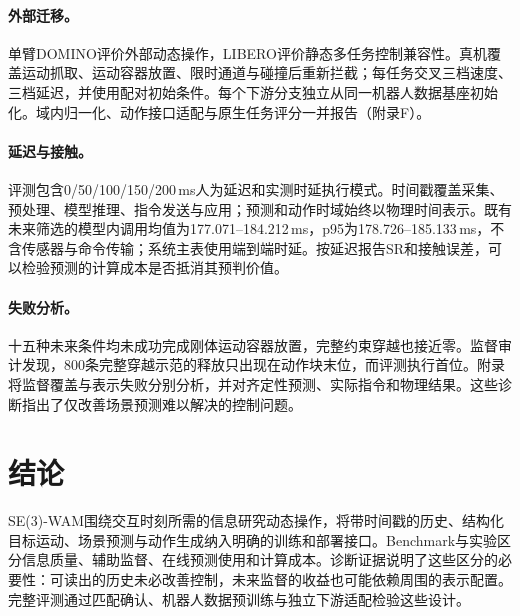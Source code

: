 \paragraph{外部迁移。}
单臂DOMINO评价外部动态操作，LIBERO\cite{libero}评价静态多任务控制兼容性。真机覆盖运动抓取、运动容器放置、限时通道与碰撞后重新拦截；每任务交叉三档速度、三档延迟，并使用配对初始条件。每个下游分支独立从同一机器人数据基座初始化。域内归一化、动作接口适配与原生任务评分一并报告（附录F）。

\paragraph{延迟与接触。}
评测包含0/50/100/150/200\,ms人为延迟和实测时延执行模式。时间戳覆盖采集、预处理、模型推理、指令发送与应用；预测和动作时域始终以物理时间表示。既有未来筛选的模型内调用均值为177.071--184.212\,ms，p95为178.726--185.133\,ms，不含传感器与命令传输；系统主表使用端到端时延。按延迟报告SR和接触误差，可以检验预测的计算成本是否抵消其预判价值。

\paragraph{失败分析。}
十五种未来条件均未成功完成刚体运动容器放置，完整约束穿越也接近零。监督审计发现，800条完整穿越示范的释放只出现在动作块末位，而评测执行首位。附录将监督覆盖与表示失败分别分析，并对齐定性预测、实际指令和物理结果。这些诊断指出了仅改善场景预测难以解决的控制问题。

\section{结论}

SE(3)-WAM围绕交互时刻所需的信息研究动态操作，将带时间戳的历史、结构化目标运动、场景预测与动作生成纳入明确的训练和部署接口。Benchmark与实验区分信息质量、辅助监督、在线预测使用和计算成本。诊断证据说明了这些区分的必要性：可读出的历史未必改善控制，未来监督的收益也可能依赖周围的表示配置。完整评测通过匹配确认、机器人数据预训练与独立下游适配检验这些设计。
